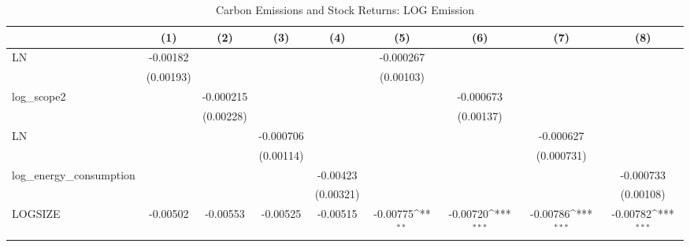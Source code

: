 \begin{table}[htbp]\centering
\def\sym#1{\ifmmode^{#1}\else\(^{#1}\)\fi}
\caption{Carbon Emissions and Stock Returns: LOG Emission}
\begin{tabular}{l*{8}{c}}
\hline\hline
                    &\multicolumn{1}{c}{(1)}         &\multicolumn{1}{c}{(2)}         &\multicolumn{1}{c}{(3)}         &\multicolumn{1}{c}{(4)}         &\multicolumn{1}{c}{(5)}         &\multicolumn{1}{c}{(6)}         &\multicolumn{1}{c}{(7)}         &\multicolumn{1}{c}{(8)}         \\
\hline
LN                  &    -0.00182         &                     &                     &                     &   -0.000267         &                     &                     &                     \\
                    &   (0.00193)         &                     &                     &                     &   (0.00103)         &                     &                     &                     \\
log\_scope2          &                     &   -0.000215         &                     &                     &                     &   -0.000673         &                     &                     \\
                    &                     &   (0.00228)         &                     &                     &                     &   (0.00137)         &                     &                     \\
LN                  &                     &                     &   -0.000706         &                     &                     &                     &   -0.000627         &                     \\
                    &                     &                     &   (0.00114)         &                     &                     &                     &  (0.000731)         &                     \\
log\_energy\_consumption&                     &                     &                     &    -0.00423         &                     &                     &                     &   -0.000733         \\
                    &                     &                     &                     &   (0.00321)         &                     &                     &                     &   (0.00108)         \\
LOGSIZE             &    -0.00502         &    -0.00553         &    -0.00525         &    -0.00515         &    -0.00775\sym{**} &    -0.00720\sym{***}&    -0.00786\sym{***}&    -0.00782\sym{***}\\

\end{tabular}
\end{table}
